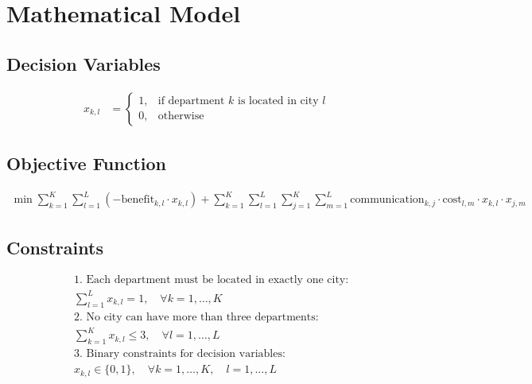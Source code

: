 \documentclass{article}
\begin{document}
\section*{Mathematical Model}

\subsection*{Decision Variables}
\begin{align*}
x_{k,l} &= 
\begin{cases} 
1, & \text{if department } k \text{ is located in city } l \\
0, & \text{otherwise}
\end{cases}
\end{align*}

\subsection*{Objective Function}
\begin{align*}
\min \sum_{k=1}^{K} \sum_{l=1}^{L} \left( -\text{benefit}_{k,l} \cdot x_{k,l} \right) + \sum_{k=1}^{K} \sum_{l=1}^{L} \sum_{j=1}^{K} \sum_{m=1}^{L} \text{communication}_{k,j} \cdot \text{cost}_{l,m} \cdot x_{k,l} \cdot x_{j,m}
\end{align*}

\subsection*{Constraints}
\begin{align*}
&\text{1. Each department must be located in exactly one city:} \\
&\sum_{l=1}^{L} x_{k,l} = 1, \quad \forall k = 1, \ldots, K \\

&\text{2. No city can have more than three departments:} \\
&\sum_{k=1}^{K} x_{k,l} \leq 3, \quad \forall l = 1, \ldots, L \\

&\text{3. Binary constraints for decision variables:} \\
&x_{k,l} \in \{0, 1\}, \quad \forall k = 1, \ldots, K, \quad l = 1, \ldots, L \\
\end{align*}
\end{document}
